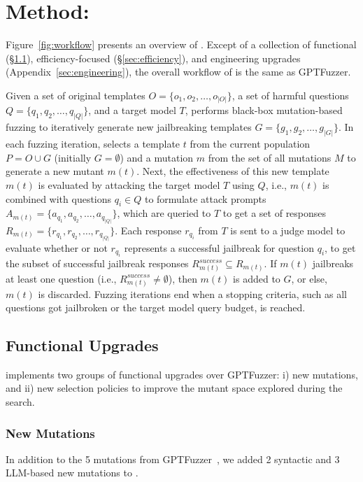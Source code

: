\section{Method: \bedrockfuzz}
\label{sec:bedrockfuzz}
Figure~\ref{fig:workflow} presents an overview of \bedrockfuzz. Except of a collection of functional (\S\ref{sec:functional}), efficiency-focused (\S\ref{sec:efficiency}), and engineering upgrades (Appendix~\ref{sec:engineering}), the overall workflow of \bedrockfuzz is the same as GPTFuzzer.

Given a set of original templates $O = \{ o_1, o_2, \dots, o_{|O|} \}$, a set of harmful questions $Q = \{ q_1, q_2, \dots, q_{|Q|} \}$, and a target model $T$, \bedrockfuzz performs black-box mutation-based fuzzing to iteratively generate new jailbreaking templates $G = \{ g_1, g_2, \dots, g_{|G|} \}$.
In each fuzzing iteration, \bedrockfuzz selects a template $t$ from the current population $P = O \cup G$ (initially $G = \emptyset$) and a mutation $m$ from the set of all mutations $M$ to generate a new mutant $m(t)$.
Next, the effectiveness of this new template $m(t)$ is evaluated by attacking the target model $T$ using $Q$, i.e., $m(t)$ is combined with questions $q_i \in Q$ to formulate attack prompts $A_{m(t)} = \{ a_{q_1}, a_{q_2}, \dots, a_{q_{|Q|}} \}$, which are queried to $T$ to get a set of responses $R_{m(t)} = \{ r_{q_1}, r_{q_2}, \dots, r_{q_{|Q|}} \}$.
Each response $r_{q_i}$ from $T$ is sent to a judge model to evaluate whether or not $r_{q_i}$ represents a successful jailbreak for question $q_i$, to get the subset of successful jailbreak responses $R_{m(t)}^{success} \subseteq R_{m(t)}$.
If $m(t)$ jailbreaks at least one question (i.e., $R_{m(t)}^{success} \neq \emptyset$), then $m(t)$ is added to $G$, or else, $m(t)$ is discarded.
Fuzzing iterations end when a stopping criteria, such as all questions got jailbroken or the target model query budget, is reached.

\subsection{Functional Upgrades}
\label{sec:functional}
\bedrockfuzz implements two groups of functional upgrades over GPTFuzzer: i) new mutations, and ii) new selection policies to improve the mutant space explored during the search.

\subsubsection{New Mutations}
\label{sec:mutations}
In addition to the 5 mutations from GPTFuzzer~\cite{yu2023gptfuzzer}, we added 2 syntactic and 3 LLM-based new mutations to \bedrockfuzz. 
 
